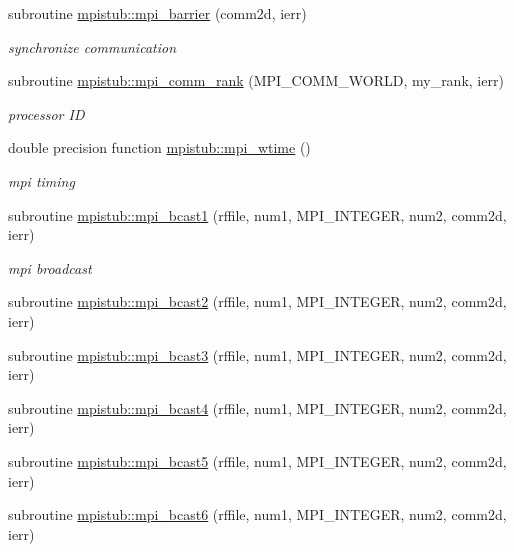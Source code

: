 \begin{DoxyCompactItemize}
\item 
subroutine \mbox{\hyperlink{namespacempistub_a0d84064615f696d4877ad9f912d4cbef}{mpistub\+::mpi\+\_\+barrier}} (comm2d, ierr)
\begin{DoxyCompactList}\small\item\em synchronize communication \end{DoxyCompactList}\item 
subroutine \mbox{\hyperlink{namespacempistub_a3085e38e0e5d38df633afc7b2d92cebb}{mpistub\+::mpi\+\_\+comm\+\_\+rank}} (M\+P\+I\+\_\+\+C\+O\+M\+M\+\_\+\+W\+O\+R\+LD, my\+\_\+rank, ierr)
\begin{DoxyCompactList}\small\item\em processor ID \end{DoxyCompactList}\item 
double precision function \mbox{\hyperlink{namespacempistub_a2456432a60801629e19273ebe4114bc9}{mpistub\+::mpi\+\_\+wtime}} ()
\begin{DoxyCompactList}\small\item\em mpi timing \end{DoxyCompactList}\item 
subroutine \mbox{\hyperlink{namespacempistub_a28c2930a0c38a6318865ef760b6e87c0}{mpistub\+::mpi\+\_\+bcast1}} (rffile, num1, M\+P\+I\+\_\+\+I\+N\+T\+E\+G\+ER, num2, comm2d, ierr)
\begin{DoxyCompactList}\small\item\em mpi broadcast \end{DoxyCompactList}\item 
subroutine \mbox{\hyperlink{namespacempistub_a0d3b09e89256fef8bc0a4f71f7ff73c0}{mpistub\+::mpi\+\_\+bcast2}} (rffile, num1, M\+P\+I\+\_\+\+I\+N\+T\+E\+G\+ER, num2, comm2d, ierr)
\item 
subroutine \mbox{\hyperlink{namespacempistub_ae8d4cdea848159c537f06677e1d7b712}{mpistub\+::mpi\+\_\+bcast3}} (rffile, num1, M\+P\+I\+\_\+\+I\+N\+T\+E\+G\+ER, num2, comm2d, ierr)
\item 
subroutine \mbox{\hyperlink{namespacempistub_abe276f0cf456de80ee888e6b335a4b7d}{mpistub\+::mpi\+\_\+bcast4}} (rffile, num1, M\+P\+I\+\_\+\+I\+N\+T\+E\+G\+ER, num2, comm2d, ierr)
\item 
subroutine \mbox{\hyperlink{namespacempistub_a79437cd731fca94bcf720d8abd6cec77}{mpistub\+::mpi\+\_\+bcast5}} (rffile, num1, M\+P\+I\+\_\+\+I\+N\+T\+E\+G\+ER, num2, comm2d, ierr)
\item 
subroutine \mbox{\hyperlink{namespacempistub_aca21309e40e0374a92a5e2a163110d1c}{mpistub\+::mpi\+\_\+bcast6}} (rffile, num1, M\+P\+I\+\_\+\+I\+N\+T\+E\+G\+ER, num2, comm2d, ierr)

\end{DoxyCompactItemize}

